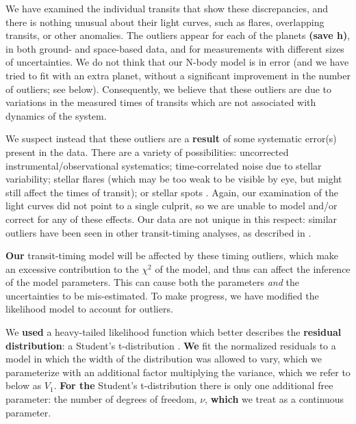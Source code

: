 \documentclass[twocolumn]{aastex63}
\begin{document}
We have examined the individual transits that show these discrepancies,
and there is nothing unusual about their light curves, such as flares,
overlapping transits, or other anomalies.  %
The outliers
appear for each of the planets \textbf{(save h)}, in both ground- and space-based data,
and for measurements with different sizes of uncertainties.  We do
not think that our N-body model is in error (and we have tried to fit
with an extra planet, without a significant improvement in the number
of outliers; see below).  Consequently, we believe that these outliers
are due to variations in the measured times of transits which are not
associated with dynamics of the system.

We suspect instead that these outliers
are a \textbf{result} of some systematic error(s) present in the data.  There are a variety
of possibilities:  uncorrected instrumental/observational systematics;
time-correlated noise due to stellar variability;  stellar flares (which
may be too weak to be visible by eye, but might still affect the
times of transit); or stellar spots \textbf{\citep{Oshagh2013,Ioannidis2015}}.
Again, our examination of
the light curves did not point to a single culprit, so we are unable
to model and/or correct for any of these effects.  Our data are not unique in this respect:  similar outliers
have been seen in other transit-timing analyses, as described
in \citet{JontofHutter2016}.

\textbf{Our} transit-timing model will be affected by these
timing outliers, which make an excessive contribution to the
$\chi^2$ of the model, and thus can affect the inference of
the model parameters.   This can cause both the parameters {\it and}
the uncertainties to be mis-estimated.  To make progress, we have
modified the likelihood model to account for outliers.

We \textbf{used} a heavy-tailed likelihood function which
better describes the \textbf{residual distribution}:  %
a Student's t-distribution \citep{JontofHutter2016}.   %
\textbf{We} fit the normalized residuals to a model
in which the width of the distribution was
allowed to vary, which we parameterize with
an additional factor multiplying the variance, which we refer to below as $V_1$.  %
\textbf{For the} Student's t-distribution there is only one
additional free parameter:  the number of
degrees of freedom, $\nu$, \textbf{which} we treat as a continuous parameter.
\end{document}
